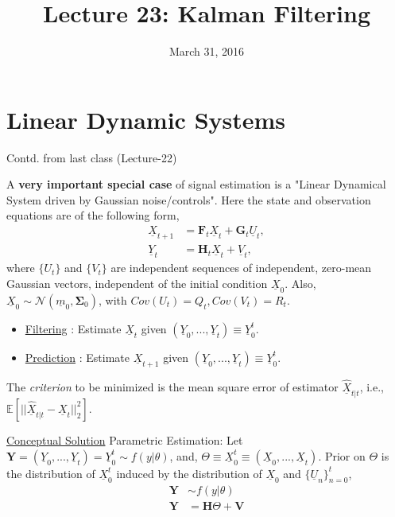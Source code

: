 \documentclass[a4paper,english,12pt]{article}
\title{Lecture 23: Kalman Filtering}
\date{March 31, 2016}
\author{}
\begin{document}
\maketitle
\maketitle
 \section{Linear Dynamic Systems}
Contd. from last class (Lecture-22)
\par A \textbf{very important special case} of signal estimation is a "Linear Dynamical System driven by Gaussian noise/controls".
Here the state and observation equations are of the following form,
 \begin{align}\label{eqn:1}
  \underline{X}_{t+1} &= \textbf{F}_t\underline{X}_t + \textbf{G}_t \underline{U}_t, \\\nonumber
  \underline{Y}_t &= \textbf{H}_t\underline{X}_t + \underline{V}_t,
\end{align}
where $\{U_t\}$ and $\{V_t\}$ are independent sequences of independent, zero-mean Gaussian vectors, independent of the initial condition $\underline{X}_0$. Also, $\underline{X}_0 \sim \mathcal{N}(\underline{m}_0,\mathbf{\Sigma}_0)$, with $Cov(U_t)=Q_t, Cov(V_t)=R_t$.
\begin{itemize}
\item \underline{Filtering} : Estimate $\underline{X}_t$ given $(\underline{Y}_0,...,\underline{Y}_t) \equiv \underline{Y}_0^t$.
\item \underline{Prediction} : Estimate $\underline{X}_{t+1}$ given $(\underline{Y}_0,...,\underline{Y}_t) \equiv \underline{Y}_0^t$.
\end{itemize}
The \textit{criterion} to be minimized is the mean square error of estimator $\underline{\hat{X}}_{t|t}$, i.e., $ \mathbb{E}[||\underline{\hat{X}}_{t|t} - \underline{X}_t||_2^2]$.
\par \underline{Conceptual Solution} Parametric Estimation: Let $\textbf{Y}=(\underline{Y}_0,...,\underline{Y}_t)=\underline{Y}_0^t\sim f(y|\theta)$, and, $\Theta \equiv \underline{X}_0^t \equiv (\underline{X}_0,...,\underline{X}_t)$. Prior on $\Theta$ is the distribution of $\underline{X}_0^t$ induced by the distribution of $\underline{X}_0$ and $\{\underline{U}_n\}_{n=0}^t$,
  \begin{align}
  \textbf{Y}&\sim f(y|\theta)\\
  \textbf{Y} &= \textbf{H}\Theta + \textbf{V}
  \end{align}
\end{document}
